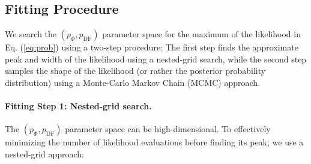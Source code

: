 \subsection{Fitting Procedure} \label{sec:fitting}

We search the $(p_\Phi,p_\text{DF})$ parameter space for the maximum of the likelihood in Eq. (\ref{eq:prob}) using a two-step procedure: The first step finds the approximate peak and width of the likelihood using a nested-grid search, while the second step samples the shape of the likelihood (or rather the posterior probability distribution) using a Monte-Carlo Markov Chain (MCMC) approach.

\paragraph{Fitting Step 1: Nested-grid search.} The $(p_\Phi,p_\text{DF})$ parameter space can be high-dimensional. To effectively minimizing the number of likelihood evaluations before finding its peak, we use a nested-grid approach:
